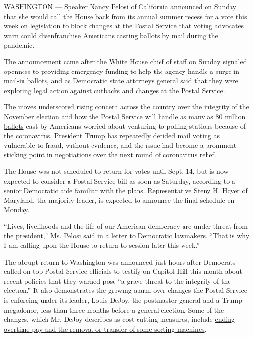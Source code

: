 WASHINGTON --- Speaker Nancy Pelosi of California announced on Sunday
that she would call the House back from its annual summer recess for a
vote this week on legislation to block changes at the Postal Service
that voting advocates warn could disenfranchise Americans
\href{https://www.nytimes3xbfgragh.onion/interactive/2020/08/11/us/politics/vote-by-mail-us-states.html}{casting
ballots by mail} during the pandemic.

The announcement came after the White House chief of staff on Sunday
signaled openness to providing emergency funding to help the agency
handle a surge in mail-in ballots, and as Democratic state attorneys
general said that they were exploring legal action against cutbacks and
changes at the Postal Service.

The moves underscored
\href{https://www.nytimes3xbfgragh.onion/2020/08/15/us/post-office-vote-by-mail.html}{rising
concern across the country} over the integrity of the November election
and how the Postal Service will handle
\href{https://www.nytimes3xbfgragh.onion/interactive/2020/08/11/us/politics/vote-by-mail-us-states.html}{as
many as 80 million ballots} cast by Americans worried about venturing to
polling stations because of the coronavirus. President Trump has
repeatedly derided mail voting as vulnerable to fraud, without evidence,
and the issue had become a prominent sticking point in negotiations over
the next round of coronavirus relief.

The House was not scheduled to return for votes until Sept. 14, but is
now expected to consider a Postal Service bill as soon as Saturday,
according to a senior Democratic aide familiar with the plans.
Representative Steny H. Hoyer of Maryland, the majority leader, is
expected to announce the final schedule on Monday.

``Lives, livelihoods and the life of our American democracy are under
threat from the president,'' Ms. Pelosi said
\href{https://www.speaker.gov/newsroom/81620-0}{in a letter to
Democratic lawmakers}. ``That is why I am calling upon the House to
return to session later this week.''

The abrupt return to Washington was announced just hours after Democrats
called on top Postal Service officials to testify on Capitol Hill this
month about recent policies that they warned pose ``a grave threat to
the integrity of the election.'' It also demonstrates the growing alarm
over changes the Postal Service is enforcing under its leader, Louis
DeJoy, the postmaster general and a Trump megadonor, less than three
months before a general election. Some of the changes, which Mr. DeJoy
describes as cost-cutting measures, include
\href{https://www.nytimes3xbfgragh.onion/2020/08/15/us/post-office-vote-by-mail.html}{ending
overtime pay and the removal or transfer of some sorting machines}.

